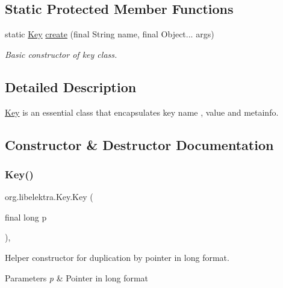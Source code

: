 \subsection*{Static Protected Member Functions}
\begin{DoxyCompactItemize}
\item 
static \hyperlink{classorg_1_1libelektra_1_1Key}{Key} \hyperlink{classorg_1_1libelektra_1_1Key_af407cf43625618af4e7fb2576037fcfc}{create} (final String name, final Object... args)
\begin{DoxyCompactList}\small\item\em Basic constructor of key class. \end{DoxyCompactList}\end{DoxyCompactItemize}


\subsection{Detailed Description}
\hyperlink{classorg_1_1libelektra_1_1Key}{Key} is an essential class that encapsulates key name , value and metainfo. 

\subsection{Constructor \& Destructor Documentation}
\mbox{\label{classorg_1_1libelektra_1_1Key_aeae5ed8b5eb0e9e4b7fce9ef9817fdfa}} 
\subsubsection{\texorpdfstring{Key()}{Key()}\hspace{0.1cm}{\footnotesize\ttfamily [1/2]}}
{\footnotesize\ttfamily org.\+libelektra.\+Key.\+Key (\begin{DoxyParamCaption}\item[{final long}]{p }\end{DoxyParamCaption})\hspace{0.3cm}{\ttfamily [inline]}, {\ttfamily [protected]}}



Helper constructor for duplication by pointer in long format. 


\begin{DoxyParams}{Parameters}
{\em p} & Pointer in long format \\
\hline
\end{DoxyParams}
\mbox{\label{classorg_1_1libelektra_1_1Key_af40497ff85d172136ed1f274a50d37e7}} 
